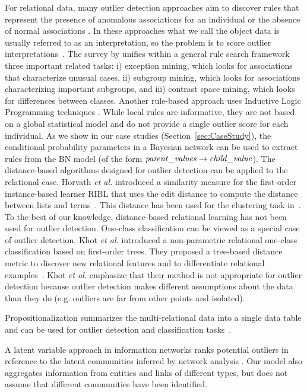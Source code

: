 {				For relational data, many outlier detection approaches aim to discover rules that represent the presence of anomalous associations for an individual or the absence of normal associations \cite{Maervoet2012,Gao2010}.    In these approaches what we call the object data is usually referred to as an interpretation, so the problem is to score outlier interpretations~\cite{Maervoet2012}. The survey by \cite{Novak2009} unifies within a general rule search framework three important related tasks: i) exception mining, which looks for associations that characterize unusual cases, ii) subgroup mining, which looks for associations  characterizing important subgroups, and iii) contrast space mining, which looks for differences between classes. Another rule-based approach uses Inductive Logic Programming techniques \cite{Angiulli2007}.
				While local rules are informative, they are not based on a global statistical model and do not provide a single outlier score for each individual. As we show in our case studies (Section~\ref{sec:CaseStudy}), the conditional probability parameters in a Bayesian network can be used to extract rules  from the BN model (of the form $\it{parent\_values} \rightarrow \it{child\_value}$).
				The distance-based algorithms designed for outlier detection can be applied to the relational case.  Horvath {\em et al.} introduced a similarity measure for the first-order instance-based learner RIBL that uses the edit distance to compute the distance between lists and terms~\cite{Horvath2001}. This distance has been used for the clustering task in~\cite{Kirsten2001}. To the best of our knowledge, distance-based relational learning has not been used for outlier detection. One-class classification can be viewed as a special case of outlier detection.  Khot {\em et al.} introduced a non-parametric relational one-class classification based on first-order trees. They proposed a tree-based distance metric to discover new relational features and to differentiate relational examples~\cite{Khot2014}. Khot {\em et al.} emphasize that their method is not appropriate for outlier detection because outlier detection makes different assumptions about the data than they do (e.g. outliers are far from other points and isolated).  
				
				 Propositionalization summarizes the multi-relational data into a single data table and can be used for outlier detection and classification tasks~\cite{Kramer2000,Lavrac13,kuzelka2008,Riahi2016,AndersonP08}. 
				
				A latent variable approach in information networks ranks potential outliers in reference to the latent communities inferred by network analysis \cite{Gao2010}. Our model also aggregates information from entities and links of different types, but does not assume that different communities have been identified. 
				
}
